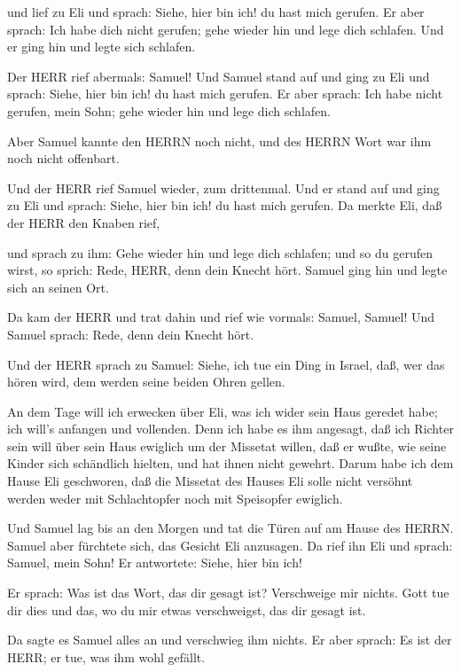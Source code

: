  und lief zu Eli und sprach: Siehe, hier bin ich! du hast
mich gerufen. Er aber sprach: Ich habe dich nicht gerufen; gehe wieder
hin und lege dich schlafen. Und er ging hin und legte sich schlafen.

 Der HERR rief abermals: Samuel! Und Samuel stand auf und
ging zu Eli und sprach: Siehe, hier bin ich! du hast mich gerufen. Er
aber sprach: Ich habe nicht gerufen, mein Sohn; gehe wieder hin und lege
dich schlafen.

 Aber Samuel kannte den HERRN noch nicht, und des HERRN Wort
war ihm noch nicht offenbart.

 Und der HERR rief Samuel wieder, zum drittenmal. Und er
stand auf und ging zu Eli und sprach: Siehe, hier bin ich! du hast mich
gerufen. Da merkte Eli, daß der HERR den Knaben rief,

 und sprach zu ihm: Gehe wieder hin und lege dich schlafen;
und so du gerufen wirst, so sprich: Rede, HERR, denn dein Knecht hört.
Samuel ging hin und legte sich an seinen Ort.

 Da kam der HERR und trat dahin und rief wie vormals:
Samuel, Samuel! Und Samuel sprach: Rede, denn dein Knecht hört.

 Und der HERR sprach zu Samuel: Siehe, ich tue ein Ding in
Israel, daß, wer das hören wird, dem werden seine beiden Ohren gellen.

 An dem Tage will ich erwecken über Eli, was ich wider sein
Haus geredet habe; ich will's anfangen und vollenden.  Denn
ich habe es ihm angesagt, daß ich Richter sein will über sein Haus
ewiglich um der Missetat willen, daß er wußte, wie seine Kinder sich
schändlich hielten, und hat ihnen nicht gewehrt.  Darum
habe ich dem Hause Eli geschworen, daß die Missetat des Hauses Eli solle
nicht versöhnt werden weder mit Schlachtopfer noch mit Speisopfer
ewiglich.

 Und Samuel lag bis an den Morgen und tat die Türen auf am
Hause des HERRN. Samuel aber fürchtete sich, das Gesicht Eli anzusagen.
 Da rief ihn Eli und sprach: Samuel, mein Sohn! Er
antwortete: Siehe, hier bin ich!

 Er sprach: Was ist das Wort, das dir gesagt ist?
Verschweige mir nichts. Gott tue dir dies und das, wo du mir etwas
verschweigst, das dir gesagt ist.

 Da sagte es Samuel alles an und verschwieg ihm nichts. Er
aber sprach: Es ist der HERR; er tue, was ihm wohl gefällt.


